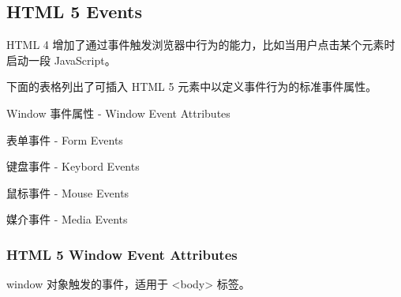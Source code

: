 \subsection{HTML 5 Events}

HTML 4 增加了通过事件触发浏览器中行为的能力，比如当用户点击某个元素时启动一段 JavaScript。

下面的表格列出了可插入 HTML 5 元素中以定义事件行为的标准事件属性。


\begin{compactitem}
\item Window 事件属性 - Window Event Attributes
\item 表单事件 - Form Events
\item 键盘事件 - Keybord Events
\item 鼠标事件 - Mouse Events
\item 媒介事件 - Media Events
\end{compactitem}


\subsubsection{HTML 5 Window Event Attributes}

window 对象触发的事件，适用于 <body> 标签。

